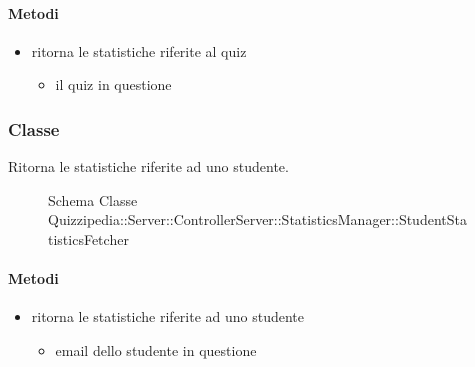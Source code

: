 \paragraph{Metodi}
\begin{itemize}
\item {}
\newline
ritorna le statistiche riferite al quiz
\newline
{}
\newline
\begin{itemize}
\item {}
\newline
il quiz in questione
\end{itemize}
\end{itemize}
\subsubsection{Classe }
Ritorna le statistiche riferite ad uno studente.
\begin{figure}[H]
\centering
\noindent{}
\caption[Schema Classe StudentStatisticsFetcher]{Schema Classe Quizzipedia::Server::ControllerServer::StatisticsManager::StudentStatisticsFetcher}
\end{figure}
\paragraph{Metodi}
\begin{itemize}
\item {}
\newline
ritorna le statistiche riferite ad uno studente
\newline
{}
\newline
\begin{itemize}
\item {}
\newline
email dello studente in questione
\end{itemize}
\end{itemize}

